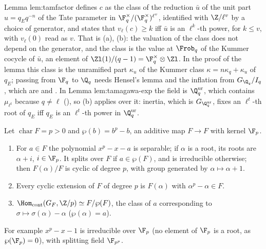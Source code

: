 \begin{paperlink}
Lemma lem:tamfactor defines $c$ as the class of the reduction $\bar u$ of the unit part $u=q_Eq^{-n}$ of the Tate parameter in
$\F_q^\times/(\F_q^\times)^{\ell^v}$, identified with $\Z/\ell^v$ by a choice of generator, and states that $v_\ell(c)\ge k$ iff $\bar u$ is an $\ell^k$-th power, for
$k\le v$, with $v_\ell(0)$ read as $v$. That is (a), (b): the valuation of the class does not depend on the generator, and
the class is the value at $\Frob_q$ of the Kummer cocycle of $\bar u$, an element of $\Zl(1)/(q-1)=\F_q^\times\otimes\Zl$. In the proof of the lemma this class is the
unramified part $\kappa_u$ of the Kummer class $\kappa=n\kappa_q+\kappa_u$ of $q_E$; passing from $\F_q$ to $\Q_q$ needs Hensel's lemma and the inflation from $G_{\Q_q}/I_q$,
which are  and . In Lemma lem:tamagawa-exp the field is $\Q_q^{\mathrm{ur}}$, which contains $\mu_{\ell^t}$ because $q\ne\ell$
(), so (b) applies over it: inertia, which is $G_{\Q_q^{\mathrm{ur}}}$, fixes an $\ell^t$-th root of $q_E$ iff $q_E$ is an
$\ell^t$-th power in $\Q_q^{\mathrm{ur}}$.
\end{paperlink}

\begin{theorem}\label{thm:galois:artin-schreier}
Let $\operatorname{char}F=p>0$ and $\wp(b)=b^p-b$, an additive map $F\to F$ with kernel $\F_p$.
\begin{enumerate}[label=(\alph*)]
\item For $a\in F$ the polynomial $x^p-x-a$ is separable; if $\alpha$ is a root, its roots are $\alpha+i$, $i\in\F_p$. It splits over $F$ if $a\in\wp(F)$, and is
irreducible otherwise; then $F(\alpha)/F$ is cyclic of degree $p$, with group generated by $\alpha\mapsto\alpha+1$.
\item Every cyclic extension of $F$ of degree $p$ is $F(\alpha)$ with $\alpha^p-\alpha\in F$.
\item $\Hom_{\mathrm{cont}}(G_F,\Z/p)\simeq F/\wp(F)$, the class of $a$ corresponding to $\sigma\mapsto\sigma(\alpha)-\alpha$ ($\wp(\alpha)=a$).
\end{enumerate}
For example $x^p-x-1$ is irreducible over $\F_p$ (no element of $\F_p$ is a root, as $\wp(\F_p)=0$), with splitting field $\F_{p^p}$.
\end{theorem}

